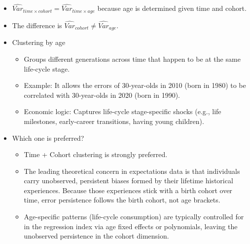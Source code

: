 \documentclass[10pt]{article}
\begin{document}
\begin{itemize}
\item 
		$ \widehat{Var}_{time  \times cohort} = \widehat{Var}_{time  \times age} $ because age is determined given time and cohort.
\item 
		The difference is $ \widehat{Var}_{cohort} \ne \widehat{Var}_{age} $.
\item 
		Clustering by age
		\begin{itemize}
		\item 
				Groups different generations across time that happen to be at the same life-cycle stage.
		\item 
				Example: It allows the errors of 30-year-olds in 2010 (born in 1980) to be correlated with 30-year-olds in 2020 (born in 1990).
		\item 
				Economic logic: Captures life-cycle stage-specific shocks (e.g., life milestones, early-career transitions, having young children).
		\end{itemize}
\item 
		Which one is preferred?
		\begin{itemize}
		\item Time + Cohort clustering is strongly preferred.
		\item The leading theoretical concern in expectations data is that individuals carry unobserved, persistent biases formed by their lifetime historical experiences. Because those experiences stick with a birth cohort over time, error persistence follows the birth cohort, not age brackets.
		\item Age-specific patterns (life-cycle consumption) are typically controlled for in the regression index via age fixed effects or polynomials, leaving the unobserved persistence in the cohort dimension.
		\end{itemize}
\end{itemize}











\end{document}
